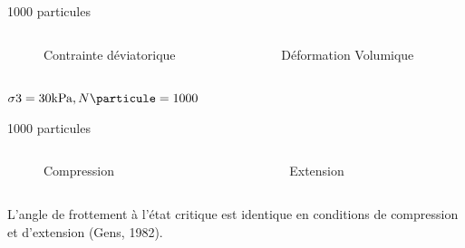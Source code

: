 \documentclass[10pt]{beamer}
\begin{document}
\begin{frame}{1000 particules}
    \begin{columns}
        \begin{column}{0.5\textwidth}
            \begin{figure}
                \centering
                \scalebox{0.5}{}
                \caption{Contrainte déviatorique}
            \end{figure}
        \end{column}
        \begin{column}{0.5\textwidth}
            \begin{figure}
                \centering
                \scalebox{0.5}{}
                \caption{Déformation Volumique}
            \end{figure}
        \end{column}
    \end{columns}
    $\sigma3 = 30 \text{kPa}, N\particule = 1000$
\end{frame}

\begin{frame}{1000 particules}
    \begin{columns}
        \begin{column}{0.5\textwidth}
            \begin{figure}
                \centering
                \scalebox{0.5}{}
                \caption{Compression}
            \end{figure}
        \end{column}
        \begin{column}{0.5\textwidth}
            \begin{figure}
                \centering
                \scalebox{0.5}{}
                \caption{Extension}
            \end{figure}
        \end{column}
    \end{columns}
    L’angle de frottement à l’état critique est identique en conditions de compression et d’extension (Gens, 1982).
\end{frame}
\end{document}
